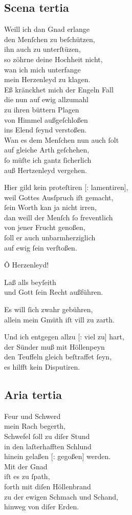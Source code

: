 \documentclass{ees}
\newenvironment{lyrics}[1]{%
  \subsection{#1}\nopagebreak%
  \begin{lyricslist}%
  \let\voice\item%
}{%
  \end{lyricslist}%
}
\begin{document}
\begin{lyrics}{Scena tertia}
  \voice[Barmh.]
  Weill ich dan Gnad erlange\\
  den Menſchen zu beſchützen,\\
  ihn auch zu unterſtüzen,\\
  so zöhrne deine Hochheit nicht,\\
  wan ich mich unterfange\\
  mein Herzenleyd zu klagen.\\
  Eß kränckhet mich der Engeln Fall\\
  die nun auf ewig allzumahl\\
  zu ihren büttern Plagen\\
  von Himmel außgeſchloßen\\
  ins Elend ſeynd verstoßen.\\
  Wan es dem Menſchen nun auch ſolt\\
  auf gleiche Arth geſchehen,\\
  ſo müſte ich gantz ſicherlich\\
  auß Hertzenleyd vergehen.

  \voice[Gerecht.]
  Hier gild kein proteſtiren [: lamentiren],\\
  weil Gottes Ausſpruch iſt gemacht,\\
  ſein Worth kan ja nicht irren,\\
  dan weill der Menſch ſo freventlich\\
  von jener Frucht genoßen,\\
  ſoll er auch unbarmherziglich\\
  auf ewig ſein verſtoßen.

  \voice[Barmh.]
  Ô Herzenleyd!

  \voice[Gerecht.]
  Laß alls beyſeith\\
  und Gott ſein Recht außführen.

  \voice[Barmh.]
  Es will ſich zwahr gebühren,\\
  allein mein Gmüth iſt vill zu zarth.

  \voice[Gerecht.]
  Und ich entgegen allzu [: viel zu] hart,\\
  der Sünder muß mit Höllenpeyn\\
  den Teuffeln gleich beſtraffet ſeyn,\\
  es hilfft kein Disputiren.
\end{lyrics}

\begin{lyrics}{Aria tertia}
  \voice[Gerecht.]
  Feur und Schwerd\\
  mein Rach begerth,\\
  Schwefel ſoll zu diſer Stund\\
  in den laſterhafften Schlund\\
  hinein gelaßen [: gegoßen] werden.\\[1ex]
  Mit der Gnad\\
  iſt es zu ſpath,\\
  forth mit diſen Höllenbrand\\
  zu der ewigen Schmach und Schand,\\
  hinweg von diſer Erden.
\end{lyrics}
\end{document}
